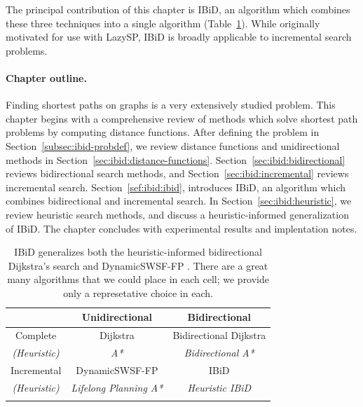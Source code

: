 The principal contribution of this chapter is IBiD,
an algorithm which combines these three techniques into a single
algorithm
(Table~\ref{tab:ibid:alg-overview}).
While originally motivated for use with LazySP,
IBiD is broadly applicable to incremental search problems.

\paragraph{Chapter outline.}
Finding shortest paths on graphs is a very extensively studied problem.
This chapter begins with a comprehensive review of 
methods which solve shortest path problems by computing
distance functions.
After defining the problem in Section~\ref{subsec:ibid-probdef},
we review distance functions and unidirectional methods
in Section~\ref{sec:ibid:distance-functions}.
Section~\ref{sec:ibid:bidirectional} reviews
bidirectional search methods,
and Section~\ref{sec:ibid:incremental} reviews incremental search.
Section~\ref{sef:ibid:ibid}, introduces IBiD,
an algorithm which combines bidirectional and incremental search.
In Section~\ref{sec:ibid:heuristic},
we review heuristic search methods,
and discuss a heuristic-informed generalization of IBiD.
The chapter concludes with experimental results and implentation notes.

\begin{table}
   \centering
   \begin{tabular}{ccc}
      \toprule
      & Unidirectional & Bidirectional \\
      \midrule
      \addlinespace[0.2em]
      Complete
         & Dijkstra \citep{dijkstra1959anote}
         & Bidirectional Dijkstra \citep{luby1989bidijk} \\
      \addlinespace[-0.2em]
      \emph{(Heuristic)}
         & \emph{A* \citep{hart1968astar}}
         & \emph{Bidirectional A* \citep{ikeda1994betterroutes}} \\
      \addlinespace[0.3em]
      Incremental
         & DynamicSWSF-FP \citep{ramalingam1996dynamicswsffp}
         & {IBiD} \\
      \addlinespace[-0.2em]
      \emph{(Heuristic)}
         & \emph{Lifelong Planning A* \citep{koenig2004lpastar}}
         & \emph{Heuristic IBiD} \\
      \addlinespace[0.2em]
      \bottomrule
   \end{tabular}
   \caption{
      IBiD generalizes both the heuristic-informed
      bidirectional Dijkstra's search \citep{goldberg2005spexternalmemory}
      and DynamicSWSF-FP \citep{ramalingam1996dynamicswsffp}.
      There are a great many algorithms that we could place in each cell;
      we provide only a represetative choice in each.}
   \label{tab:ibid:alg-overview}
\end{table}

